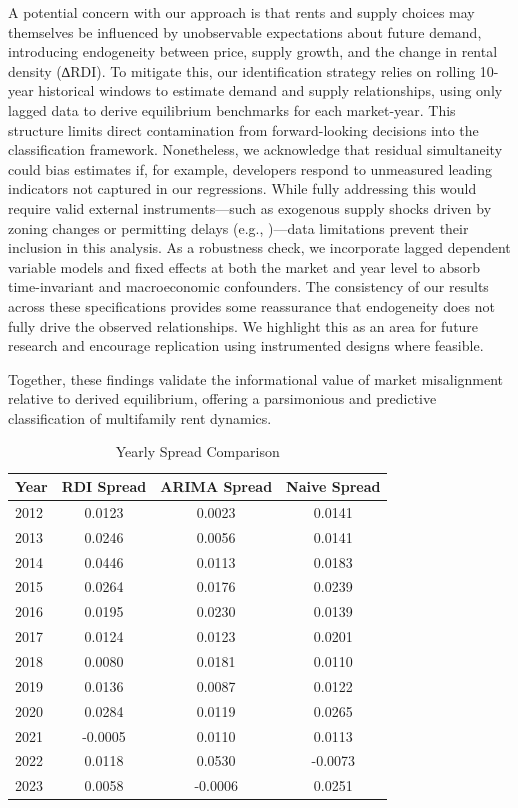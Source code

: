 \documentclass[APA,Times1COL]{WileyNJDv5} %
\begin{document}
A potential concern with our approach is that rents and supply choices may themselves be influenced by unobservable expectations about future demand, introducing endogeneity between price, supply growth, and the change in rental density (∆RDI). To mitigate this, our identification strategy relies on rolling 10-year historical windows to estimate demand and supply relationships, using only lagged data to derive equilibrium benchmarks for each market-year. This structure limits direct contamination from forward-looking decisions into the classification framework. Nonetheless, we acknowledge that residual simultaneity could bias estimates if, for example, developers respond to unmeasured leading indicators not captured in our regressions. While fully addressing this would require valid external instruments—such as exogenous supply shocks driven by zoning changes or permitting delays (e.g., \cite{saiz2010geographic})—data limitations prevent their inclusion in this analysis. As a robustness check, we incorporate lagged dependent variable models and fixed effects at both the market and year level to absorb time-invariant and macroeconomic confounders. The consistency of our results across these specifications provides some reassurance that endogeneity does not fully drive the observed relationships. We highlight this as an area for future research and encourage replication using instrumented designs where feasible.

Together, these findings validate the informational value of market misalignment relative to derived equilibrium, offering a parsimonious and predictive classification of multifamily rent dynamics.

\begin{table}[ht]
	\centering
	\caption{Yearly Spread Comparison}
	\label{tab:yearly_spread}
	\begin{tabular}{lccc}
		\toprule
		Year & RDI Spread & ARIMA Spread & Naive Spread \\
		\midrule
		
		2012 & 0.0123     & 0.0023      & 0.0141     \\
		2013 & 0.0246     & 0.0056      & 0.0141     \\
		2014 & 0.0446     & 0.0113      & 0.0183     \\
		2015 & 0.0264     & 0.0176      & 0.0239     \\
		2016 & 0.0195     & 0.0230      & 0.0139     \\
		2017 & 0.0124     & 0.0123      & 0.0201     \\
		2018 & 0.0080     & 0.0181      & 0.0110     \\
		2019 & 0.0136     & 0.0087      & 0.0122     \\
		2020 & 0.0284     & 0.0119      & 0.0265     \\
		2021 & -0.0005    & 0.0110      & 0.0113     \\
		2022 & 0.0118     & 0.0530      & -0.0073    \\
		2023 & 0.0058     & -0.0006     & 0.0251     \\
		
		\bottomrule
	\end{tabular}
\end{table}
\end{document}
